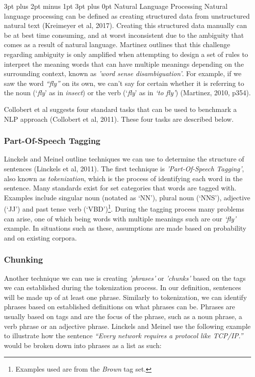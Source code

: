 \documentclass[12pt,a4paper]{article}
\makeatletter
\renewcommand\subsection{\@startsection {subsection}{1}{2mm} %
                               {3pt plus 2pt minus 1pt} %
                               {3pt plus 0pt} %
                               {\normalfont\bfseries}}
\makeatother
\begin{document}
\subsection{Natural Language Processing}
Natural language processing can be defined as creating structured data from unstructured natural text (Kreimeyer et al, 2017). Creating this structured data manually can be at best time consuming, and at worst inconsistent due to the ambiguity that comes as a result of natural language. Martinez outlines that this challenge regarding ambiguity is only amplified when attempting to design a set of rules to interpret the meaning words that can have multiple meanings depending on the surrounding context, known as \emph{'word sense disambiguation'}. For example, if we saw the word \emph{``fly''} on its own, we can't say for certain whether it is referring to the noun (`\emph{fly}' as in \emph{insect}) or the verb (`\emph{fly}' as in \emph{`to fly'}) (Martinez, 2010, p354).\newline

Collobert et al suggests four standard tasks that can be used to benchmark a NLP approach (Collobert et al, 2011). These four tasks are described below. \newline

\subsubsection{Part-Of-Speech Tagging}
Linckels and Meinel outline techniques we can use to determine the structure of sentences (Linckels et al, 2011). The first technique is \emph{'Part-Of-Speech Tagging'}, also known as \emph{tokenization}, which is the process of identifying each word in the sentence. Many standards exist for set categories that words are tagged with. Examples include singular noun (notated as `NN'), plural noun (`NNS'), adjective (`JJ') and past tense verb (`VBD')\footnote{Examples used are from the \emph{Brown} tag set.}. During the tagging process many problems can arise, one of which being words with multiple meanings such are our \emph{`fly'} example. In situations such as these, assumptions are made based on probability and on existing corpora.\newline

\subsubsection{Chunking}
Another technique we can use is creating \emph{'phrases'} or \emph{'chunks'} based on the tags we can established during the tokenization process. In our definition, sentences will be made up of at least one phrase. Similarly to tokenization, we can identify phrases based on established definitions on what phrases can be. Phrases are usually based on tags and are the focus of the phrase, such as a noun phrase, a verb phrase or an adjective phrase. Linckels and Meinel use the following example to illustrate how the sentence \emph{``Every network requires a protocol like TCP/IP.''} would be broken down into phrases as a list as such:\newline
\end{document}
